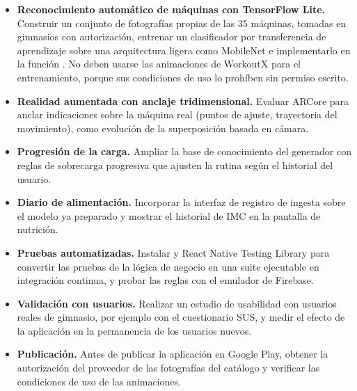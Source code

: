 \begin{itemize}
    \item \textbf{Reconocimiento automático de máquinas con TensorFlow Lite.}
    Construir un conjunto de fotografías propias de las 35 máquinas, tomadas
    en gimnasios con autorización, entrenar un clasificador por transferencia
    de aprendizaje sobre una arquitectura ligera como MobileNet e implementarlo
    en la función . No deben usarse las animaciones
    de WorkoutX para el entrenamiento, porque sus condiciones de uso lo
    prohíben sin permiso escrito.
    \item \textbf{Realidad aumentada con anclaje tridimensional.} Evaluar
    ARCore para anclar indicaciones sobre la máquina real (puntos de ajuste,
    trayectoria del movimiento), como evolución de la superposición basada en
    cámara.
    \item \textbf{Progresión de la carga.} Ampliar la base de conocimiento del
    generador con reglas de sobrecarga progresiva que ajusten la rutina según
    el historial del usuario.
    \item \textbf{Diario de alimentación.} Incorporar la interfaz de registro
    de ingesta sobre el modelo ya preparado y mostrar el historial de IMC en
    la pantalla de nutrición.
    \item \textbf{Pruebas automatizadas.} Instalar  y
    React Native Testing Library para convertir las pruebas de la lógica de
    negocio en una suite ejecutable en integración continua, y probar las
    reglas con el emulador de Firebase.
    \item \textbf{Validación con usuarios.} Realizar un estudio de usabilidad
    con usuarios reales de gimnasio, por ejemplo con el cuestionario SUS, y
    medir el efecto de la aplicación en la permanencia de los usuarios nuevos.
    \item \textbf{Publicación.} Antes de publicar la aplicación en Google
    Play, obtener la autorización del proveedor de las fotografías del
    catálogo y verificar las condiciones de uso de las animaciones.
\end{itemize}
